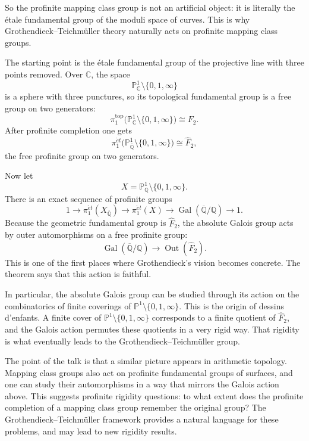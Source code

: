 \medskip\noindent
So the profinite mapping class group is not
an artificial object: it is literally the
\'etale fundamental group of the moduli
space of curves. This is why
Grothendieck--Teichm\"uller theory naturally
acts on profinite mapping class groups.

\medskip\noindent
The starting point is the \'etale
fundamental group of the projective line with
three points removed. Over $\mathbb{C}$, the
space
$$
\mathbb{P}^1_{\mathbb{C}} \setminus \{0,1,\infty\}
$$
is a sphere with three punctures, so its
topological fundamental group is a free group
on two generators:
$$
\pi_1^{\mathrm{top}}
\bigl(\mathbb{P}^1_{\mathbb{C}} \setminus
\{0,1,\infty\}\bigr)
\cong F_2.
$$
After profinite completion one gets
$$
\pi_1^{\acute{e}t}
\bigl(\mathbb{P}^1_{\overline{\mathbb{Q}}} \setminus
\{0,1,\infty\}\bigr)
\cong \widehat{F}_2,
$$
the free profinite group on two generators.

\medskip\noindent
Now let
$$
X=\mathbb{P}^1_{\mathbb{Q}} \setminus
\{0,1,\infty\}.
$$
There is an exact sequence of profinite
groups
$$
1\to
\pi_1^{\acute{e}t}(X_{\overline{\mathbb{Q}}})
\to
\pi_1^{\acute{e}t}(X)
\to
\operatorname{Gal}(\overline{\mathbb{Q}}/\mathbb{Q})
\to 1.
$$
Because the geometric fundamental group is
\(\widehat{F}_2\), the absolute Galois group
acts by outer automorphisms on a free
profinite group:
$$
\operatorname{Gal}(\overline{\mathbb{Q}}/\mathbb{Q})
\longrightarrow
\operatorname{Out}(\widehat{F}_2).
$$
This is one of the first places where
Grothendieck's vision becomes concrete.
The theorem says that this action is
faithful.

\medskip\noindent
In particular, the absolute Galois group can
be studied through its action on the
combinatorics of finite coverings of
\(\mathbb{P}^1\setminus\{0,1,\infty\}\).
This is the origin of dessins d'enfants.
A finite cover of
\(\mathbb{P}^1\setminus\{0,1,\infty\}\)
corresponds to a finite quotient of
\(\widehat{F}_2\), and the Galois action
permutes these quotients in a very rigid way.
That rigidity is what eventually leads to the
Grothendieck--Teichm\"uller group.

\medskip\noindent
The point of the talk is that a similar
picture appears in arithmetic topology.
Mapping class groups also act on profinite
fundamental groups of surfaces, and one can
study their automorphisms in a way that
mirrors the Galois action above. This
suggests profinite rigidity questions: to
what extent does the profinite completion of
a mapping class group remember the original
group? The Grothendieck--Teichm\"uller
framework provides a natural language for
these problems, and may lead to new rigidity
results.

